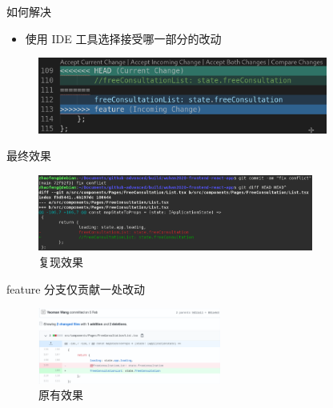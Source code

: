 \documentclass[notheorems,xetex]{beamer}
\theoremstyle{definition}
\begin{document}
\begin{frame}{如何解决}
\begin{itemize}
	\item 使用 IDE 工具选择接受哪一部分的改动
\end{itemize}
\begin{figure}
	\includegraphics[height=2.5cm]{accept_incoming.png}
\end{figure}

\end{frame}
\begin{frame}{最终效果}
\begin{figure}
\includegraphics[height=2.5cm]{recover_changes.png}
\caption{复现效果}
\end{figure}
feature 分支仅贡献一处改动
\begin{figure}
	\includegraphics[height=2.5cm]{original.png}
	\caption{原有效果}
\end{figure}
\end{frame}
\end{document}
